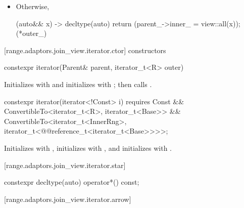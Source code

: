 {\begin{itemdescr}
{\begin{itemize}
\item Otherwise,
\begin{codeblock}
[this](auto&& x) -> decltype(auto) {
  return (parent_->inner_ = view::all(x));
}(*outer_)
\end{codeblock}
\end{itemize}
} %
\end{itemdescr}

[range.adaptors.join_view.iterator.ctor]{ constructors}

\begin{itemdecl}
constexpr iterator(Parent& parent, iterator_t<R> outer)
\end{itemdecl}

\begin{itemdescr}
\pnum
\effects Initializes  with  and initializes
 with ; then calls .
\end{itemdescr}

\begin{itemdecl}
constexpr iterator(iterator<!Const> i) requires Const &&
  ConvertibleTo<iterator_t<R>, iterator_t<Base>> &&
  ConvertibleTo<iterator_t<InnerRng>,
      iterator_t<@@reference_t<iterator_t<Base>>>>;
\end{itemdecl}

\begin{itemdescr}
\pnum
\effects Initializes  with , initializes
 with , and initializes  with
.
\end{itemdescr}

[range.adaptors.join_view.iterator.star]{}

\begin{itemdecl}
constexpr decltype(auto) operator*() const;
\end{itemdecl}

\begin{itemdescr}
\pnum
\oldtxt{\returns} 
\end{itemdescr}

{\color{newclr}
[range.adaptors.join_view.iterator.arrow]{}

}}
